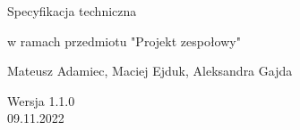 \begin{titlepage}
   \begin{center}
        \vspace*{1cm}
        
        \huge
        Specyfikacja techniczna
        
        \small
        w ramach przedmiotu "Projekt zespołowy"
        
        \normalsize

        \vspace{0.5cm}
            
        \vspace{1.5cm}

        Mateusz Adamiec, Maciej Ejduk, Aleksandra Gajda\\

        \vfill
            
        \vspace{0.8cm}
            
        Wersja 1.1.0\\
        09.11.2022
            
   \end{center}
\end{titlepage}